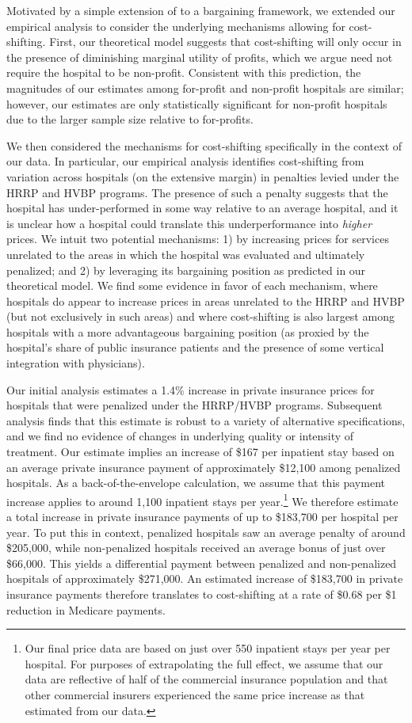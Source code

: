 \documentclass[12pt]{article}
\begin{document}
Motivated by a simple extension of \cite{dranove1988} to a bargaining framework, we extended our empirical analysis to consider the underlying mechanisms allowing for cost-shifting. First, our theoretical model suggests that cost-shifting will only occur in the presence of diminishing marginal utility of profits, which we argue need not require the hospital to be non-profit. Consistent with this prediction, the magnitudes of our estimates among for-profit and non-profit hospitals are similar; however, our estimates are only statistically significant for non-profit hospitals due to the larger sample size relative to for-profits.

We then considered the mechanisms for cost-shifting specifically in the context of our data. In particular, our empirical analysis identifies cost-shifting from variation across hospitals (on the extensive margin) in penalties levied under the HRRP and HVBP programs. The presence of such a penalty suggests that the hospital has under-performed in some way relative to an average hospital, and it is unclear how a hospital could translate this underperformance into \textit{higher} prices. We intuit two potential mechanisms: 1) by increasing prices for services unrelated to the areas in which the hospital was evaluated and ultimately penalized; and 2) by leveraging its bargaining position as predicted in our theoretical model. We find some evidence in favor of each mechanism, where hospitals do appear to increase prices in areas unrelated to the HRRP and HVBP (but not exclusively in such areas) and where cost-shifting is also largest among hospitals with a more advantageous bargaining position (as proxied by the hospital's share of public insurance patients and the presence of some vertical integration with physicians).

Our initial analysis estimates a 1.4\% increase in private insurance prices for hospitals that were penalized under the HRRP/HVBP programs. Subsequent analysis finds that this estimate is robust to a variety of alternative specifications, and we find no evidence of changes in underlying quality or intensity of treatment. Our estimate implies an increase of \$167 per inpatient stay based on an average private insurance payment of approximately \$12,100 among penalized hospitals. As a back-of-the-envelope calculation, we assume that this payment increase applies to around 1,100 inpatient stays per year.\footnote{Our final price data are based on just over 550 inpatient stays per year per hospital. For purposes of extrapolating the full effect, we assume that our data are reflective of half of the commercial insurance population and that other commercial insurers experienced the same price increase as that estimated from our data.} We therefore estimate a total increase in private insurance payments of up to \$183,700 per hospital per year. To put this in context, penalized hospitals saw an average penalty of around \$205,000, while non-penalized hospitals received an average bonus of just over \$66,000. This yields a differential payment between penalized and non-penalized hospitals of approximately \$271,000. An estimated increase of \$183,700 in private insurance payments therefore translates to cost-shifting at a rate of \$0.68 per \$1 reduction in Medicare payments.
\end{document}
